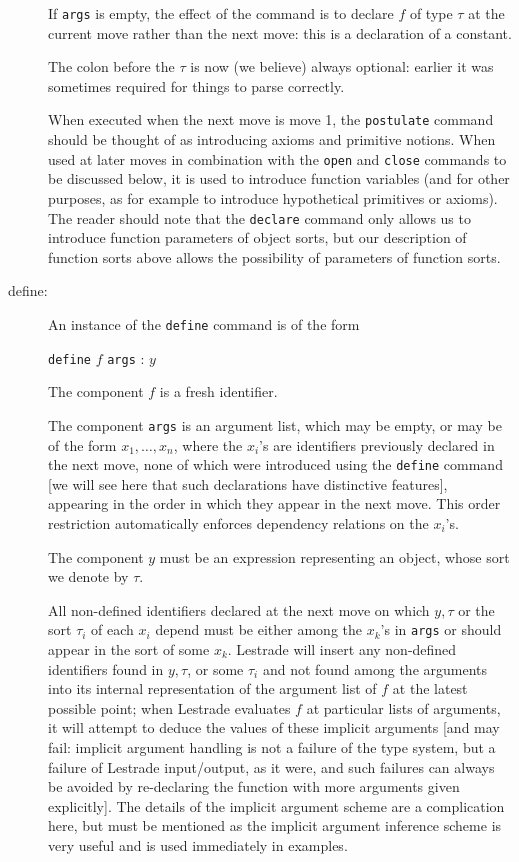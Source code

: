 \documentclass[12pt]{article}
\begin{document}
\begin{description}
If {\tt args} is empty, the effect of the command is to declare $f$ of type $\tau$ at the current move rather than the next move:  this is a declaration of a constant.  

The colon before the $\tau$ is now (we believe) always optional:  earlier it was sometimes required for things to parse correctly.

When executed when the next move is move 1, the {\tt postulate} command should be thought of as introducing  axioms and primitive notions.  When used at later moves in combination with the {\tt open} and {\tt close} commands to be discussed below, it is used to introduce function variables (and for other purposes, as for example to introduce hypothetical primitives or axioms).  The reader should note that the {\tt declare} command only allows us to introduce function parameters of object sorts,  but our description of function sorts above allows the possibility of parameters of function sorts.

\item[define:]  An instance of the {\tt define} command is of the form 

{\tt define} $f$ {\tt args} : $y$

The component $f$ is a fresh identifier.

The component {\tt args} is an argument list, which may be empty, or may be of the form $x_1,\ldots,x_n$, where the $x_i$'s are identifiers previously declared in the next move, none of which were introduced using the {\tt define} command [we will see here that such declarations have distinctive features], appearing in the order in which they appear in the next move.  This order restriction automatically enforces dependency relations
on the $x_i$'s. 
 
The component $y$ must be an expression representing an object, whose sort we denote by $\tau$.  

All non-defined identifiers declared at the next move on which $y, \tau$ or the sort $\tau_i$ of each $x_i$ depend must be either among the $x_k$'s in {\tt args} or should appear in the sort of some $x_k$.  Lestrade will insert any non-defined identifiers found in $y,\tau$, or some $\tau_i$ and not found among the arguments into its internal representation of the argument list of $f$ at the latest possible point;  when Lestrade evaluates $f$ at particular lists of arguments, it will attempt to deduce the values of these implicit arguments [and may fail:  implicit argument handling is not a failure of the type system, but a failure of Lestrade input/output, as it were, and such failures can always be avoided by re-declaring the function with more arguments given explicitly].  The details of the implicit argument scheme are a complication here, but must be mentioned as the implicit argument inference scheme is very useful and is used immediately in examples.


\end{description}
\end{document}
